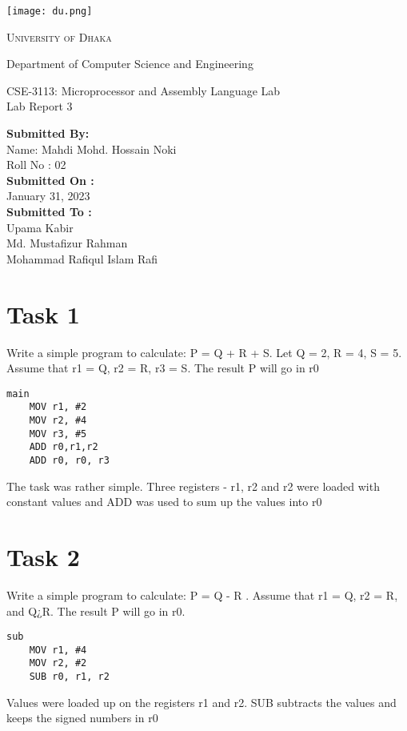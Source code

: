 \documentclass{article}
\begin{document}
\begin{titlepage}
	\begin{center}
    	\texttt{[image: du.png]}\par
		\begin{Huge}
			\textsc{University of Dhaka}\par
		\end{Huge}
		\begin{Large}
			Department of Computer Science and Engineering\par \vspace{1cm}
			CSE-3113: Microprocessor and Assembly Language Lab \\[12pt]	
			Lab Report 3\\[8pt]
		\end{Large}
	\end{center}  	
	\begin{large}
		\textbf{Submitted By:\\[12pt]}
			Name: Mahdi Mohd. Hossain Noki\\[8pt]
			Roll No : 02\\[12pt]
		\textbf{Submitted On : \\[12pt]}
			January 31, 2023\\[15pt]
		\textbf{Submitted To :\\[12pt]}
            Upama Kabir\\[10pt]
            Md. Mustafizur Rahman\\[10pt]
            Mohammad Rafiqul Islam Rafi\\[10pt]
                \newpage
	\end{large}
\end{titlepage}

\section{Task 1}
\begin{listing}[h]
Write a simple program to calculate: P = Q + R + S. Let Q = 2, R = 4, S = 5. Assume
that r1 = Q, r2 = R, r3 = S. The result P will go in r0
\begin{verbatim}
main
	MOV r1, #2
	MOV r2, #4
	MOV r3, #5
	ADD r0,r1,r2
	ADD r0, r0, r3 
\end{verbatim}
The task was rather simple. Three registers - r1, r2 and r2 were loaded with constant values and ADD was used to sum up the values into r0
\end{listing}

\section{Task 2}
\begin{listing}[h]
Write a simple program to calculate: P = Q - R . Assume that r1 = Q, r2 = R, and Q¿R.
The result P will go in r0.
\begin{verbatim}
sub
	MOV r1, #4
	MOV r2, #2
	SUB r0, r1, r2
\end{verbatim}
Values were loaded up on the registers r1 and r2. SUB subtracts the values and keeps the signed numbers in r0
\end{listing}
\end{document}
